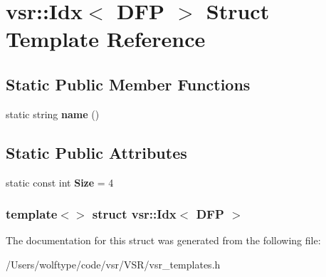 \hypertarget{structvsr_1_1_idx_3_01_d_f_p_01_4}{\section{vsr\-:\-:Idx$<$ D\-F\-P $>$ Struct Template Reference}
\label{structvsr_1_1_idx_3_01_d_f_p_01_4}
}
\subsection*{Static Public Member Functions}
\begin{DoxyCompactItemize}
\item 
\hypertarget{structvsr_1_1_idx_3_01_d_f_p_01_4_a79b987863fa7dbf33d006dc2d8243b2f}{static string {\bfseries name} ()}\label{structvsr_1_1_idx_3_01_d_f_p_01_4_a79b987863fa7dbf33d006dc2d8243b2f}

\end{DoxyCompactItemize}
\subsection*{Static Public Attributes}
\begin{DoxyCompactItemize}
\item 
\hypertarget{structvsr_1_1_idx_3_01_d_f_p_01_4_ac63e1cfa7171c84219afaee70e19a0c0}{static const int {\bfseries Size} = 4}\label{structvsr_1_1_idx_3_01_d_f_p_01_4_ac63e1cfa7171c84219afaee70e19a0c0}

\end{DoxyCompactItemize}
\subsubsection*{template$<$$>$ struct vsr\-::\-Idx$<$ D\-F\-P $>$}



The documentation for this struct was generated from the following file\-:\begin{DoxyCompactItemize}
\item 
/\-Users/wolftype/code/vsr/\-V\-S\-R/vsr\-\_\-templates.\-h\end{DoxyCompactItemize}
